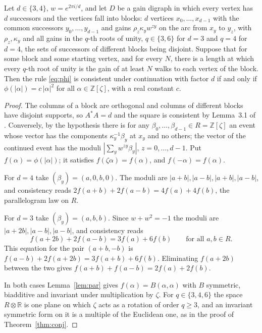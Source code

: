 \begin{proposition}\label{prop:deg34}
Let $d\in\{3,4\}$, $w=e^{2\pi i/d}$, and let $D$ be a gain digraph in which every vertex has $d$ successors and the vertices fall into blocks: $d$ vertices $x_0,\dots,x_{d-1}$ with the common successors $y_0,\dots,y_{d-1}$ and gains $\rho_z\kappa_y w^{zy}$ on the arc from $x_y$ to $y_z$, with $\rho_z,\kappa_y$ and all gains in the $q$-th roots of unity, $q\in\{3,6\}$ for $d=3$ and $q=4$ for $d=4$, the sets of successors of different blocks being disjoint. Suppose that for some block and some starting vertex, and for every $N$, there is a length at which every $q$-th root of unity is the gain of at least $N$ walks to each vertex of the block. Then the rule \eqref{eq:phi} is consistent under continuation with factor $d$ if and only if $\phi(|\alpha|)=c\,|\alpha|^2$ for all $\alpha\in\mathbb{Z}[\zeta]$, with a real constant $c$.
\end{proposition}
\begin{proof}
The columns of a block are orthogonal and columns of different blocks have disjoint supports, so $A^*A=d$ and the square is consistent by Lemma~3.1 of \cite{g9}. Conversely, by the hypothesis there is for any $\beta_0,\dots,\beta_{d-1}\in R=\mathbb{Z}[\zeta]$ an event whose vector has the components $\kappa_y^{-1}\beta_y$ at $x_y$ and no others; the vector of the continued event has the moduli $|\sum_yw^{zy}\beta_y|$, $z=0,\dots,d-1$. Put $f(\alpha)=\phi(|\alpha|)$; it satisfies $f(\zeta\alpha)=f(\alpha)$, and $f(-\alpha)=f(\alpha)$.

For $d=4$ take $(\beta_y)=(a,0,b,0)$. The moduli are $|a+b|,|a-b|,|a+b|,|a-b|$, and consistency reads $2f(a+b)+2f(a-b)=4f(a)+4f(b)$, the parallelogram law on $R$.

For $d=3$ take $(\beta_y)=(a,b,b)$. Since $w+w^2=-1$ the moduli are $|a+2b|,|a-b|,|a-b|$, and consistency reads
\[
f(a+2b)+2f(a-b)=3f(a)+6f(b)\qquad\text{for all }a,b\in R .
\]
This equation for the pair $(a+b,-b)$ is $f(a-b)+2f(a+2b)=3f(a+b)+6f(b)$. Eliminating $f(a+2b)$ between the two gives $f(a+b)+f(a-b)=2f(a)+2f(b)$.

In both cases Lemma~\ref{lem:par} gives $f(\alpha)=B(\alpha,\alpha)$ with $B$ symmetric, biadditive and invariant under multiplication by $\zeta$. For $q\in\{3,4,6\}$ the space $R\otimes\mathbb{R}$ is one plane on which $\zeta$ acts as a rotation of order $q\ge3$, and an invariant symmetric form on it is a multiple of the Euclidean one, as in the proof of Theorem~\ref{thm:conj}.
\end{proof}

